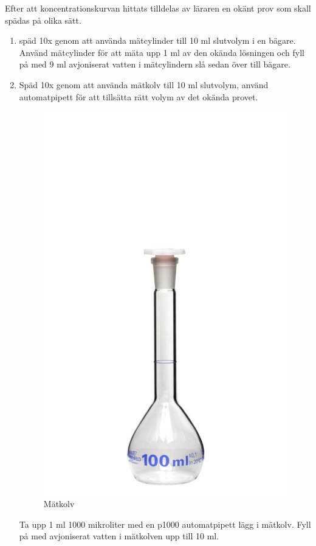 \documentclass[./chem_exercises.tex]{subfiles}
\begin{document}
Efter att koncentrationskurvan hittats tilldelas av läraren en okänt prov
som skall spädas på olika sätt.

\begin{enumerate}
\item späd 10x genom att använda mätcylinder till 10 ml slutvolym i en bägare.
Använd mätcylinder för att mäta upp 1 ml av den okända lösningen och fyll på med
9 ml avjoniserat vatten i mätcylindern slå sedan över till bägare.

\item Späd 10x genom att använda mätkolv till 10 ml slutvolym, använd automatpipett för att
tillsätta rätt volym av det okända provet.
\begin{figure}[H]
\begin{center}
  \includegraphics[scale=0.1]{mätkolv.jpg}
  \caption{Mätkolv}
  \end{center}
  \label{fig4}
\end{figure}
Ta upp 1 ml 1000 mikroliter med en p1000 automatpipett lägg i mätkolv. Fyll på med
avjoniserat vatten i mätkolven upp till 10 ml.


\end{enumerate}
\end{document}
